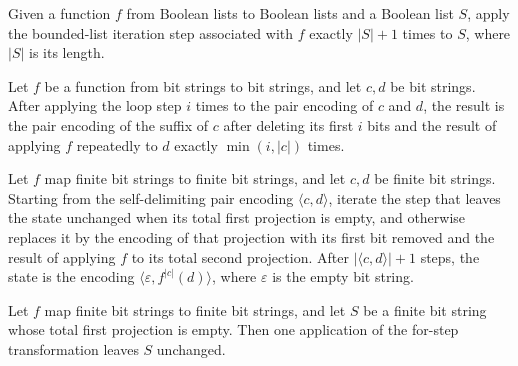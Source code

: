 \begin{definition}
\label{Complexity.BinArith.forLoop}
\leanok
{}
Given a function $f$ from Boolean lists to Boolean lists and a Boolean list $S$, apply
the bounded-list iteration step associated with $f$ exactly $|S|+1$ times to $S$, where
$|S|$ is its length.
\end{definition}

\begin{theorem}
\label{Complexity.BinArith.iterate_forStep}
\leanok
{}
Let $f$ be a function from bit strings to bit strings, and let $c,d$ be bit strings.
After applying the loop step $i$ times to the pair encoding of $c$ and $d$, the result
is the pair encoding of the suffix of $c$ after deleting its first $i$ bits and the
result of applying $f$ repeatedly to $d$ exactly $\min(i,|c|)$ times.
\end{theorem}

\begin{theorem}
\label{Complexity.BinArith.forLoop_pairEncode}
\leanok
{}
Let $f$ map finite bit strings to finite bit strings, and let $c,d$ be finite bit
strings. Starting from the self-delimiting pair encoding $\langle c,d\rangle$, iterate
the step that leaves the state unchanged when its total first projection is empty, and
otherwise replaces it by the encoding of that projection with its first bit removed and
the result of applying $f$ to its total second projection. After $|\langle
c,d\rangle|+1$ steps, the state is the encoding $\langle\varepsilon,f^{|c|}(d)\rangle$,
where $\varepsilon$ is the empty bit string.
\end{theorem}

\begin{theorem}
\label{Complexity.BinArith.forStep_of_fst_nil}
\leanok
{}
Let $f$ map finite bit strings to finite bit strings, and let $S$ be a finite bit string
whose total first projection is empty. Then one application of the for-step
transformation leaves $S$ unchanged.
\end{theorem}

